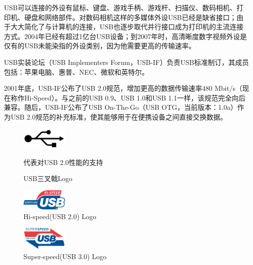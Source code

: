 USB可以连接的外设有鼠标、键盘、游戏手柄、游戏杆、扫描仪、数码相机、打印机、硬盘和网络部件。对数码相机这样的多媒体外设USB已经是缺省接口；由于大大简化了与计算机的连接，USB也逐步取代并行接口成为打印机的主流连接方式。2004年已经有超过1亿台USB设备；到2007年时，高清晰度数字视频外设是仅有的USB未能染指的外设类别，因为他需要更高的传输速率。


USB实装论坛（USB Implementers Forum，USB-IF）负责USB标准制订，其成员包括：苹果电脑、惠普、NEC、微软和英特尔。

2001年底，USB-IF公布了USB 2.0规范，增加更高的数据传输速率480 Mbit/s（现在称作Hi-Speed）。与之前的USB 0.9、USB 1.0和USB 1.1一样，该规范完全向后兼容。随后，USB-IF公布了USB On-The-Go（USB OTG，当前版本：1.0a）作为USB 2.0规范的补充标准，使其能够用于在便携设备之间直接交换数据。

\begin{figure}[ht]
	\begin{center}
		\includegraphics[keepaspectratio,width=0.2\textwidth]{Hardwares/usb-logo.png}
	\caption{USB三叉戟Logo}
	代表对USB 2.0性能的支持
	\label{fig:usb-trident-logo}
	\end{center}
\end{figure}

\begin{figure}[ht]
	\begin{center}
		\includegraphics[keepaspectratio,width=0.2\textwidth]{Hardwares/usb-hi-speed-logo.png}
	\caption{Hi-speed(USB 2.0) Logo}
	\label{fig:usb-high-speed-logo}
	\end{center}
\end{figure}

\begin{figure}[ht]
	\begin{center}
		\includegraphics[keepaspectratio,width=0.2\textwidth]{Hardwares/usb-super-speed-logo.png}
	\caption{Super-speed(USB 3.0) Logo}
	\label{fig:usb-super-speed-logo}
	\end{center}
\end{figure}


